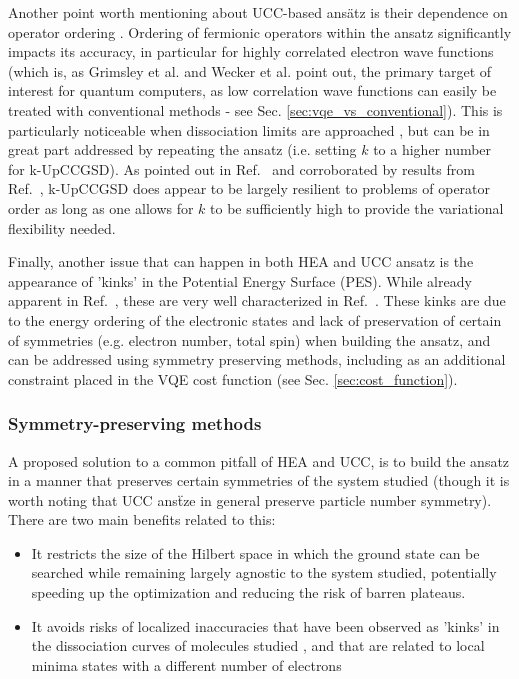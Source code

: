Another point worth mentioning about UCC-based ans\"atz is their dependence on operator ordering \cite{Grimsley2019_UCC_Review, Izmaylov2020b}. Ordering of fermionic operators within the ansatz significantly impacts its accuracy, in particular for highly correlated electron wave functions (which is, as Grimsley et al. \cite{Grimsley2019_UCC_Review} and Wecker et al. \cite{Wecker2015} point out, the primary target of interest for quantum computers, as low correlation wave functions can easily be treated with conventional methods - see Sec. \ref{sec:vqe_vs_conventional}). This is particularly noticeable when dissociation limits are approached \cite{Grimsley2019_UCC_Review, Matsuzawa2020}, but can be in great part addressed by repeating the ansatz (i.e. setting $k$ to a higher number for k-UpCCGSD). As pointed out in Ref.~\cite{Lee2019} and corroborated by results from Ref.~\cite{Grimsley2019_UCC_Review}, k-UpCCGSD does appear to be largely resilient to problems of operator order as long as one allows for $k$ to be sufficiently high to provide the variational flexibility needed. 

Finally, another issue that can happen in both HEA and UCC ansatz is the appearance of 'kinks' in the Potential Energy Surface (PES). While already apparent in Ref.~\cite{Kandala2017}, these are very well characterized in Ref.~\cite{Ryabinkin2019}. These kinks are due to the energy ordering of the electronic states and lack of preservation of certain of symmetries (e.g. electron number, total spin) when building the ansatz, and can be addressed using symmetry preserving methods, including as an additional constraint placed in the VQE cost function \cite{Ryabinkin2019} (see Sec. \ref{sec:cost_function}).

\subsubsection{Symmetry-preserving methods} \label{sec:symmetry_preserving_methods}

A proposed solution to a common pitfall of HEA and UCC, is to build the ansatz in a manner that preserves certain symmetries of the system studied (though it is worth noting that UCC ans\"tze in general preserve particle number symmetry). There are two main benefits related to this:
\begin{itemize}
    \item It restricts the size of the Hilbert space in which the ground state can be searched while remaining largely agnostic to the system studied, potentially speeding up the optimization and reducing the risk of barren plateaus.
    \item It avoids risks of localized inaccuracies that have been observed as 'kinks' in the dissociation curves of molecules studied \cite{Kandala2017}, and that are related to local minima states with a different number of electrons \cite{Ryabinkin2019}
\end{itemize}


